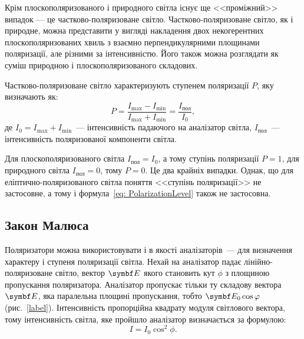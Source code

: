 Крім плоскополяризованого і природного світла існує ще <<проміжний>> випадок ---
це частково-поляризоване світло. Частково-поляризоване світло, як і природне, можна представити у вигляді накладення
двох некогерентних плоскополяризованих хвиль з взаємно перпендикулярними площинами поляризації, але різними за інтенсивністю. Його також можна розглядати як суміш природною  і плоскополяризованого складових.

Частково-поляризоване світло характеризують ступенем поляризації $P$, яку визначають як:
\begin{equation}\label{eq: PolarizationLevel}
    P = \frac{I_{\max} - I_{\min}}{I_{\max} + I_{\min}} = \frac{I_\text{пол}}{I_0},
\end{equation}
де $I_0 = I_{\max} + I_{\min}$~--- інтенсивність падаючого на аналізатор світла, $I_\text{пол}$~--- інтенсивність поляризованої компоненти світла. 

Для плоскополяризованого світла $I_\text{пол} = I_0$, а тому ступінь поляризації $P = 1$, для природного світла $I_\text{пол} = 0$, тому  $P = 0$. Це два крайніх випадки. Однак,  що для еліптично-поляризованого світла поняття <<ступінь поляризації>> не застосовне, а тому і формула~\eqref{eq: PolarizationLevel} також не застосовна.

\subsection{Закон Малюса}

Поляризатори можна використовувати і в якості аналізаторів~--- для визначення характеру і ступеня поляризації світла.
Нехай на аналізатор падає лінійно-поляризоване світло, вектор $\Efield$ якого становить кут $\phi$ з площиною пропускання
поляризатора. Аналізатор пропускає тільки ту складову вектора $\Efield$, яка паралельна площині пропускання, тобто $\Efield_0 \cos\phi$ (рис.~\ref{label}). Інтенсивність пропорційна квадрату модуля світлового вектора, тому інтенсивність світла, яке пройшло аналізатор визначається за формулою:
\begin{equation}\label{eq:MaluseLow}
    I = I_0\cos^2\phi.
\end{equation}

